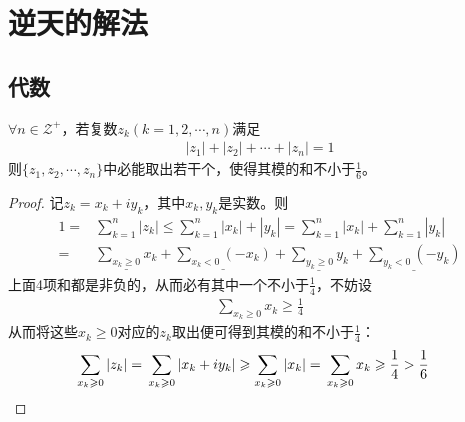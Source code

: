 
\chapter{逆天的解法}
\label{chap:genius-solution}

\section{代数}
\label{sec:genius-solution-algebra}

\begin{example}
  $\forall n\in\mathcal{Z}^+$，若复数$z_k(k=1,2,\cdots,n)$满足
  \begin{align*}
    |z_1| + |z_2| + \cdots + |z_n| = 1
  \end{align*}
  则$\{z_1,z_2,\cdots,z_n\}$中必能取出若干个，使得其模的和不小于$\frac16$。
\end{example}
\begin{proof}
  记$z_k=x_k + i y_k$，其中$x_k,y_k$是实数。则
  \begin{align*}
    1 ={}& \sum_{k=1}^n |z_k| \le \sum_{k=1}^n |x_k| + |y_k|
    = \sum_{k=1}^n |x_k| + \sum_{k=1}^n |y_k|\\
    ={}& \underline{\sum_{x_k\ge 0}x_k} + \underline{\sum_{x_k<0}(-x_k)} +
         \underline{\sum_{y_k\ge 0}y_k} + \underline{\sum_{y_k<0}(-y_k)}
  \end{align*}
  上面4项和都是非负的，从而必有其中一个不小于$\frac14$，不妨设
  \begin{align*}
    \sum_{x_k\ge 0}x_k\ge\frac14
  \end{align*}
  从而将这些$x_k\ge 0$对应的$z_k$取出便可得到其模的和不小于$\frac14$：
  \begin{align*}
    \sum_{x_k\ge0}|z_k|={}&\sum_{x_k\ge0}|x_k+iy_k|\ge \sum_{x_k\ge0}|x_k|
    ={}\sum_{x_k\ge0}x_k\ge\frac14>\frac16&\qedhere
  \end{align*}
\end{proof}

